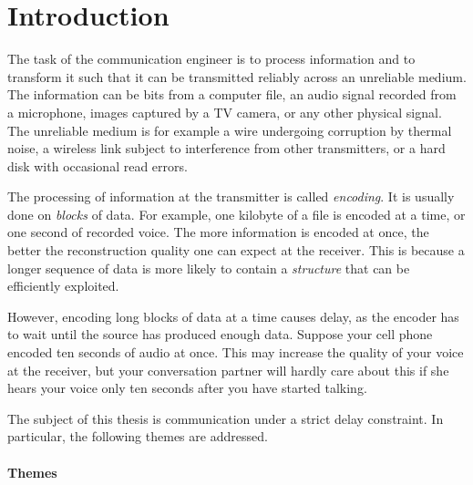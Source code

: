 \chapter*{Introduction}

The task of the communication engineer is to process information and to
transform it such that it can be transmitted reliably across an unreliable
medium. The information can be bits from a computer file, an audio signal
recorded from a microphone, images captured by a TV camera, or any other
physical signal. The unreliable medium is for example a wire undergoing
corruption by thermal noise, a wireless link subject to interference from other
transmitters, or a hard disk with occasional read errors.

The processing of information at the transmitter is called \emph{encoding}. It
is usually done on \emph{blocks} of data. For example, one kilobyte of a file is
encoded at a time, or one second of recorded voice. The more information is
encoded at once, the better the reconstruction quality one can expect at the
receiver. This is because a longer sequence of data is more likely to contain a
\emph{structure} that can be efficiently exploited. 

However, encoding long blocks of data at a time causes delay, as the encoder has
to wait until the source has produced enough data. Suppose your cell phone
encoded ten seconds of audio at once. This may increase the quality of your
voice at the receiver, but your conversation partner will hardly care about this
if she hears your voice only ten seconds after you have started talking.  

The subject of this thesis is communication under a strict delay constraint. In
particular, the following themes are addressed. 

\subsubsection{Themes}

